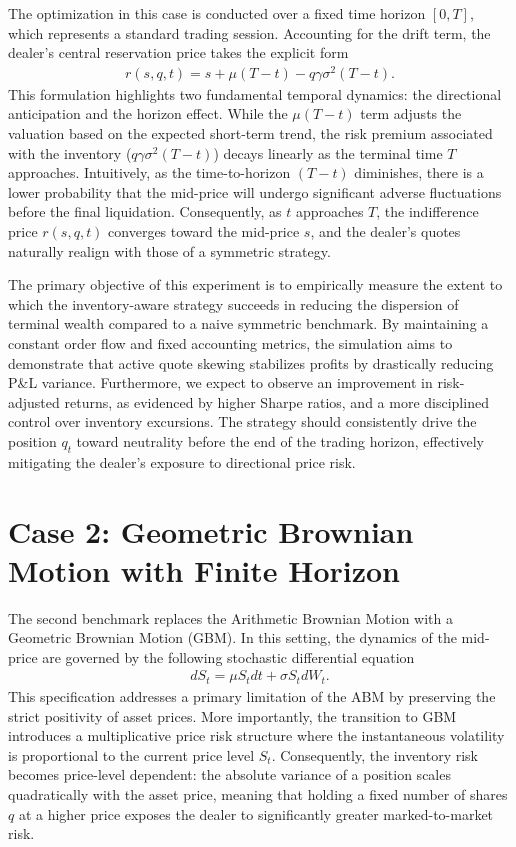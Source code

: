 \documentclass[a4paper,10pt,titlepage,oneside,openany]{book}
\theoremstyle{plain}\newtheorem{theorem}{Theorem}[chapter]
\theoremstyle{definition}\newtheorem{definition}{Definition}[chapter]
\theoremstyle{remark}\newtheorem{remark}{Remark}[chapter]
\begin{document}
The optimization in this case is conducted over a fixed time horizon $[0, T]$, which represents a standard trading session. Accounting for the drift term, the dealer's central reservation price takes the explicit form 
\begin{align*}
    r(s, q, t) = s + \mu(T-t) - q\gamma\sigma^2(T-t).
\end{align*}
This formulation highlights two fundamental temporal dynamics: the directional anticipation and the horizon effect. While the $\mu(T-t)$ term adjusts the valuation based on the expected short-term trend, the risk premium associated with the inventory ($q\gamma\sigma^2(T-t)$) decays linearly as the terminal time $T$ approaches. Intuitively, as the time-to-horizon $(T-t)$ diminishes, there is a lower probability that the mid-price will undergo significant adverse fluctuations before the final liquidation. Consequently, as $t$ approaches $T$, the indifference price $r(s, q, t)$ converges toward the mid-price $s$, and the dealer's quotes naturally realign with those of a symmetric strategy.

The primary objective of this experiment is to empirically measure the extent to which the inventory-aware strategy succeeds in reducing the dispersion of terminal wealth compared to a naive symmetric benchmark. By maintaining a constant order flow and fixed accounting metrics, the simulation aims to demonstrate that active quote skewing stabilizes profits by drastically reducing P\&L variance. Furthermore, we expect to observe an improvement in risk-adjusted returns, as evidenced by higher Sharpe ratios, and a more disciplined control over inventory excursions. The strategy should consistently drive the position $q_t$ toward neutrality before the end of the trading horizon, effectively mitigating the dealer's exposure to directional price risk.

\section{Case 2: Geometric Brownian Motion with Finite Horizon}

The second benchmark replaces the Arithmetic Brownian Motion with a Geometric Brownian Motion (GBM). In this setting, the dynamics of the mid-price are governed by the following stochastic differential equation
\begin{align*}
    dS_t = \mu S_t dt + \sigma S_t dW_t.
\end{align*}
This specification addresses a primary limitation of the ABM by preserving the strict positivity of asset prices. More importantly, the transition to GBM introduces a multiplicative price risk structure where the instantaneous volatility is proportional to the current price level $S_t$. Consequently, the inventory risk becomes price-level dependent: the absolute variance of a position scales quadratically with the asset price, meaning that holding a fixed number of shares $q$ at a higher price exposes the dealer to significantly greater marked-to-market risk.
\end{document}
